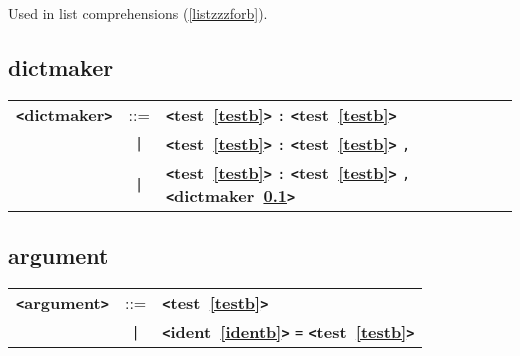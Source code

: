 \documentclass[12pt]{article}
\begin{document}
Used in list comprehensions (\ref{listzzzforb}).

\subsection{dictmaker}
\label{dictmakerb}
\begin{tabular}{lcl}
{\bf \verb+<+dictmaker\verb+>+} & ::=  & {\bf \verb+<+test~\ref{testb}\verb+>+}  \verb|:| {\bf \verb+<+test~\ref{testb}\verb+>+}  \\
 & \verb+|+  & {\bf \verb+<+test~\ref{testb}\verb+>+}  \verb|:| {\bf \verb+<+test~\ref{testb}\verb+>+}  \verb|,| \\
 & \verb+|+  & {\bf \verb+<+test~\ref{testb}\verb+>+}  \verb|:| {\bf \verb+<+test~\ref{testb}\verb+>+}  \verb|,| {\bf \verb+<+dictmaker~\ref{dictmakerb}\verb+>+}  \\
\end{tabular}

\subsection{argument}
\label{argumentb}
\begin{tabular}{lcl}
{\bf \verb+<+argument\verb+>+} & ::=  & {\bf \verb+<+test~\ref{testb}\verb+>+}  \\
 & \verb+|+  & {\bf \verb+<+ident~\ref{identb}\verb+>+}  \verb|=| {\bf \verb+<+test~\ref{testb}\verb+>+}  \\
\end{tabular}
\end{document}
